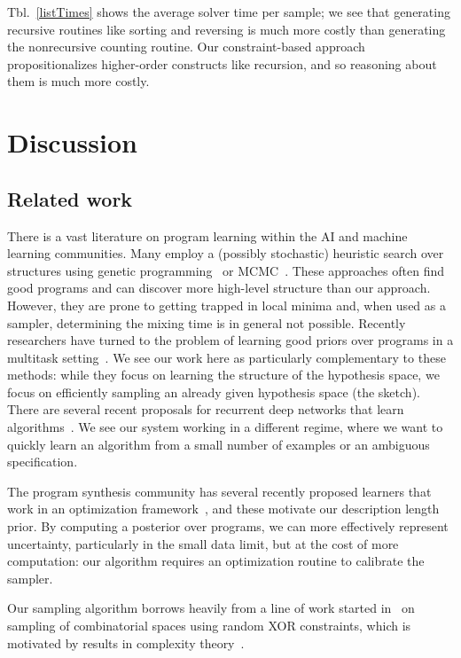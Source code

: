 \documentclass{article}
\begin{document}
Tbl.~\ref{listTimes} shows the average solver time per sample; we see that generating recursive routines like sorting and reversing is much more costly than generating the nonrecursive counting routine.
Our constraint-based approach propositionalizes higher-order constructs like recursion, and so reasoning about them is much more costly.




\section{Discussion}

\subsection{Related work}
There is a vast literature on program learning within the AI and machine learning communities.
Many employ a (possibly stochastic) heuristic search over structures using genetic programming~\cite{DBLP:books/daglib/0070933} or MCMC~\cite{schkufza2013stochastic}.
These approaches often find good programs and can discover more high-level structure than our approach.
However, they are prone to getting trapped in local minima
and, when used as a sampler, determining the mixing time is in general not possible.
Recently researchers have turned to the problem of learning good priors over programs in a multitask setting~\cite{DBLP:conf/icml/LiangJK10,menon2013machine,Dechter:2013:BLV:2540128.2540316}.
We see our work here as particularly complementary to these methods: while they focus on learning the structure of the hypothesis space,
we focus on efficiently sampling an already given hypothesis space (the sketch).
There are several recent proposals for recurrent deep networks that learn algorithms~\cite{DBLP:journals/corr/ReedF15,graves2014neural}.
We see our system working in a different regime,
where we want to quickly learn an algorithm from a small number of examples or an ambiguous specification.

The program synthesis community has several recently proposed learners that work in an optimization framework~\cite{raychev2016learning,ellis2015unsupervised,singh2013automated}, and these motivate our description length prior.
By computing a posterior over programs, we can more effectively represent uncertainty, particularly in the small data limit, but at the cost of more computation: our algorithm requires an optimization routine to calibrate the sampler.


Our sampling algorithm borrows heavily from a line of work started in~\cite{gomes2006near,gomes2006model} on sampling of combinatorial spaces using random XOR constraints, which is motivated by results in complexity theory~\cite{valiant1985np}.
\end{document}
